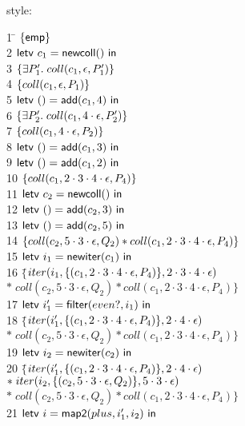 \documentclass[preprint,natbib]{sigplanconf}
\begin{document}
style: {\small
\begin{tabbing}
1 \qquad \= $\{{\mathsf{emp}}\}$ \\
2 \> $\mbox{\textsf{{letv }}}c_1 = \mbox{\textsf{{newcoll}}}()\mbox{\textsf{{ in }}}$ \\
3 \> $\{{\exists P'_1.\; coll(c_1, \epsilon, P'_1)}\}$ \\
4 \> $\{{coll(c_1, \epsilon, P_1)}\}$ \\
5 \> $\mbox{\textsf{{letv }}}() = \mbox{\textsf{{add}}}(c_1, 4)\mbox{\textsf{{ in }}}$ \\
6 \> $\{{\exists P'_2.\; coll(c_1, 4\cdot\epsilon, P'_2)}\}$ \\
7 \> $\{{coll(c_1, 4\cdot\epsilon, P_2)}\}$ \\
8 \> $\mbox{\textsf{{letv }}}() = \mbox{\textsf{{add}}}(c_1, 3)\mbox{\textsf{{ in }}}$ \\
9 \> $\mbox{\textsf{{letv }}}() = \mbox{\textsf{{add}}}(c_1, 2)\mbox{\textsf{{ in }}}$ \\
10 \> $\{{coll(c_1, 2\cdot3\cdot4\cdot\epsilon, P_4)}\}$ \\
11 \> $\mbox{\textsf{{letv }}}c_2 = \mbox{\textsf{{newcoll}}}()\mbox{\textsf{{ in }}}$ \\
12 \> $\mbox{\textsf{{letv }}}() = \mbox{\textsf{{add}}}(c_2, 3)\mbox{\textsf{{ in }}}$ \\
13 \> $\mbox{\textsf{{letv }}}() = \mbox{\textsf{{add}}}(c_2, 5)\mbox{\textsf{{ in }}}$ \\
14\> $\{{coll(c_2, 5\cdot3\cdot\epsilon, Q_2) * coll(c_1, 2\cdot3\cdot4\cdot\epsilon, P_4)}\}$ \\
15\> $\mbox{\textsf{{letv }}}i_1 = \mbox{\textsf{{newiter}}}(c_1)\mbox{\textsf{{ in }}}$ \\
16\> $\{$\=$iter(i_1, \{{(c_1, 2\cdot3\cdot4\cdot\epsilon, P_4)}\}, 2\cdot3\cdot4\cdot\epsilon)$
\\ 
  \>\>$*\; coll(c_2, 5\cdot3\cdot\epsilon, Q_2) * coll(c_1, 2\cdot3\cdot4\cdot\epsilon, P_4)\}$ \\
17 \> $\mbox{\textsf{{letv }}}i'_1 = \mbox{\textsf{{filter}}}(even?, i_1)\mbox{\textsf{{ in }}}$ \\
18 \> $\{$\=$iter(i'_1, \{{(c_1, 2\cdot3\cdot4\cdot\epsilon, P_4)}\}, 2\cdot4\cdot\epsilon)$ \\
   \>\>$*\; coll(c_2, 5\cdot3\cdot\epsilon, Q_2) * coll(c_1, 2\cdot3\cdot4\cdot\epsilon, P_4)\}$\\
19 \> $\mbox{\textsf{{letv }}}i_2 = \mbox{\textsf{{newiter}}}(c_2)\mbox{\textsf{{ in }}}$ \\
20 \> $\{$\=$iter(i'_1, \{{(c_1, 2\cdot3\cdot4\cdot\epsilon, P_4)}\}, 2\cdot4\cdot\epsilon)$\\
  \>\>$*\;iter(i_2, \{{(c_2, 5\cdot3\cdot\epsilon, Q_2)}\}, 5\cdot3\cdot\epsilon)$ \\
  \>\>$*\;coll(c_2, 5\cdot3\cdot\epsilon, Q_2) * coll(c_1, 2\cdot3\cdot4\cdot\epsilon, P_4)\}$ \\
21 \> $\mbox{\textsf{{letv }}}i = \mbox{\textsf{{map2}}}(plus, i'_1, i_2)\mbox{\textsf{{ in }}}$ \\

\end{tabbing}}
\end{document}
